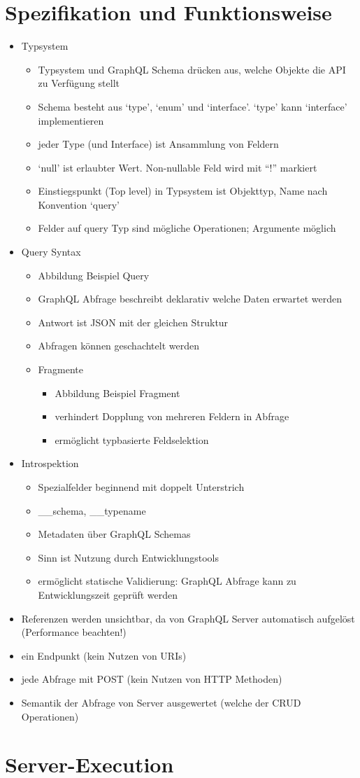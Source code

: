 \section{Spezifikation und Funktionsweise}
\begin{itemize}
  \item Typsystem
  \begin{itemize}
    \item Typsystem und GraphQL Schema drücken aus, welche Objekte die API zu Verfügung stellt
    \item Schema besteht aus `type', `enum' und `interface'. `type' kann `interface' implementieren
    \item jeder Type (und Interface) ist Ansammlung von Feldern
    \item `null' ist erlaubter Wert. Non-nullable Feld wird mit \enquote{!} markiert
    \item Einstiegspunkt (Top level) in Typsystem ist Objekttyp, Name nach Konvention `query'
    \item Felder auf query Typ sind mögliche Operationen; Argumente möglich
  \end{itemize}
  \item Query Syntax
  \begin{itemize}
    \item Abbildung Beispiel Query
    \item GraphQL Abfrage beschreibt deklarativ welche Daten erwartet werden
    \item Antwort ist JSON mit der gleichen Struktur
    \item Abfragen können geschachtelt werden
    \item Fragmente
    \begin{itemize}
      \item Abbildung Beispiel Fragment
      \item verhindert Dopplung von mehreren Feldern in Abfrage
      \item ermöglicht typbasierte Feldselektion
    \end{itemize}
  \end{itemize}
  \item Introspektion
  \begin{itemize}
    \item Spezialfelder beginnend mit doppelt Unterstrich
    \item \_\_schema, \_\_typename
    \item Metadaten über GraphQL Schemas
    \item Sinn ist Nutzung durch Entwicklungstools
    \item ermöglicht statische Validierung: GraphQL Abfrage kann zu Entwicklungszeit geprüft werden
  \end{itemize}
  \item Referenzen werden unsichtbar, da von GraphQL Server automatisch aufgelöst (Performance beachten!)
  \item ein Endpunkt (kein Nutzen von URIs)
  \item jede Abfrage mit POST (kein Nutzen von HTTP Methoden)
  \item Semantik der Abfrage von Server ausgewertet (welche der CRUD Operationen)
\end{itemize}

\section{Server-Execution}
